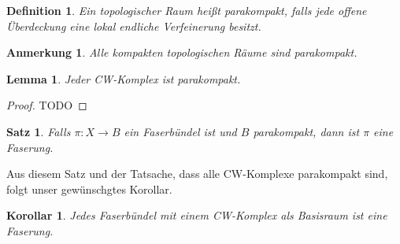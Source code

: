 \documentclass[12pt, hidelinks]{article}
\numberwithin{conj}{section}
\newtheorem{definition}[conj]{Definition}
\newtheorem{remark}[conj]{Anmerkung}
\newtheorem{theorem}[conj]{Satz}
\newtheorem{lemma}[conj]{Lemma}
\newtheorem{corollary}[conj]{Korollar}
\begin{document}
\begin{definition}
Ein topologischer Raum heißt parakompakt, falls jede offene Überdeckung eine lokal endliche Verfeinerung besitzt.
\end{definition}

\begin{remark}
Alle kompakten topologischen Räume sind parakompakt.
\end{remark}

\begin{lemma}
Jeder CW-Komplex ist parakompakt.
\end{lemma}

\begin{proof}
TODO
\end{proof}

\begin{theorem}{\cite[Theorem 1]{huebsch1955}}
Falls $\pi: X \to B$ ein Faserbündel ist und $B$ parakompakt, dann ist $\pi$ eine Faserung.
\end{theorem}

Aus diesem Satz und der Tatsache, dass alle CW-Komplexe parakompakt sind, folgt unser gewünschgtes Korollar.

\begin{corollary}
Jedes Faserbündel mit einem CW-Komplex als Basisraum ist eine Faserung.
\end{corollary}
\end{document}
